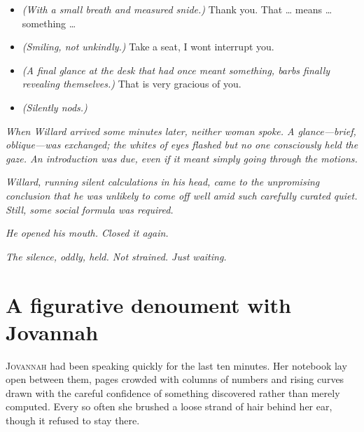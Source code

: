 \begin{itemize}
    \item[\textbf{Jovannah:}] \textit{(With a small breath and measured snide.)} Thank you. That … means … something …

    \item[\textbf{Eleanor:}] \textit{(Smiling, not unkindly.)} Take a seat, I wont interrupt you.

    \item[\textbf{Jovannah:}] \textit{(A final glance at the desk that had once meant something, barbs finally revealing themselves.)} That is very gracious of you.

    \item[\textbf{Eleanor:}] \textit{(Silently nods.)}
\end{itemize}

\textit{When Willard arrived some minutes later, neither woman spoke. A glance—brief, oblique—was exchanged; the whites of eyes flashed but no one consciously held the gaze. An introduction was due, even if it meant simply going through the motions.}

\smallskip

\textit{Willard, running silent calculations in his head, came to the unpromising conclusion that he was unlikely to come off well amid such carefully curated quiet. Still, some social formula was required.}

\smallskip

\textit{He opened his mouth. Closed it again.}

\smallskip

\textit{The silence, oddly, held. Not strained. Just waiting.}

\section*{A figurative denoument with Jovannah}

\lettrine{J}{ovannah} had been speaking quickly for the last ten minutes. Her notebook lay open between them, pages crowded with columns of numbers and rising curves drawn with the careful confidence of something discovered rather than merely computed. Every so often she brushed a loose strand of hair behind her ear, though it refused to stay there.


